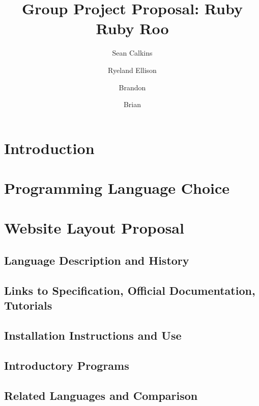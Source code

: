 \documentclass{article}
\title{Group Project Proposal: Ruby Ruby Roo}
\author{
  Sean Calkins \\
  \texttt{}
  \and
  Ryeland Ellison \\
  \texttt{}
  \and
  Brandon \\
  \texttt{}
  \and
  Brian\\
  \texttt{}
}
\begin{document}
\maketitle

\section{Introduction}

\section{Programming Language Choice}

\section{Website Layout Proposal}

\subsection{Language Description and History}

\subsection{Links to Specification, Official Documentation, Tutorials}

\subsection{Installation Instructions and Use}

\subsection{Introductory Programs}

\subsection{Related Languages and Comparison}
\end{document}
